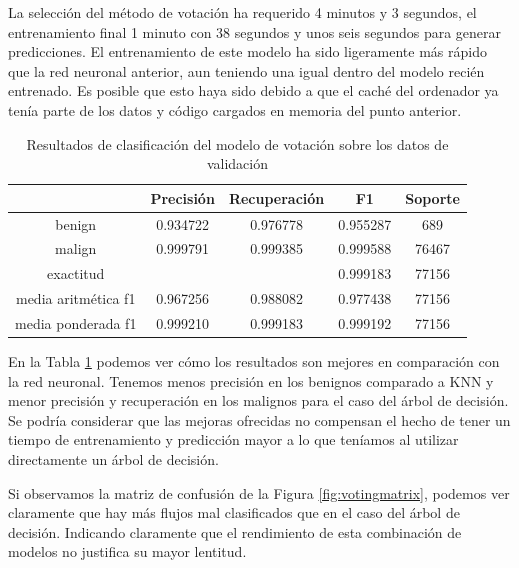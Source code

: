 La selección del método de votación ha requerido 4 minutos y 3 segundos, el entrenamiento final 1 minuto con 38 segundos y unos seis segundos para generar predicciones. El entrenamiento de este modelo ha sido ligeramente más rápido que la red neuronal anterior, aun teniendo una igual dentro del modelo recién entrenado. Es posible que esto haya sido debido a que el caché del ordenador ya tenía parte de los datos y código cargados en memoria del punto anterior.

\begin{table}[H]
    \begin{center}
        \begin{tabular}{|c | c c c | c |} 
            \hline
            & \textbf{Precisión} & \textbf{Recuperación} & \textbf{F1}  & \textbf{Soporte} \\
            \hline
            benign               & 0.934722 & 0.976778 & 0.955287  &   689 \\
            malign               & 0.999791 & 0.999385 & 0.999588  & 76467 \\
            \hline
            exactitud            &          &          & 0.999183 & 77156 \\
            media aritmética f1  & 0.967256 & 0.988082 & 0.977438 & 77156 \\
            media ponderada f1   & 0.999210 & 0.999183 & 0.999192 & 77156 \\
            \hline
        \end{tabular}
    \end{center}
    \caption{Resultados de clasificación del modelo de votación sobre los datos de validación}
    \label{table:votingresults}
\end{table}

En la Tabla \ref{table:votingresults} podemos ver cómo los resultados son mejores en comparación con la red neuronal. Tenemos menos precisión en los benignos comparado a KNN y menor precisión y recuperación en los malignos para el caso del árbol de decisión. Se podría considerar que las mejoras ofrecidas no compensan el hecho de tener un tiempo de entrenamiento y predicción mayor a lo que teníamos al utilizar directamente un árbol de decisión.

Si observamos la matriz de confusión de la Figura \ref{fig:votingmatrix}, podemos ver claramente que hay más flujos mal clasificados que en el caso del árbol de decisión. Indicando claramente que el rendimiento de esta combinación de modelos no justifica su mayor lentitud.

